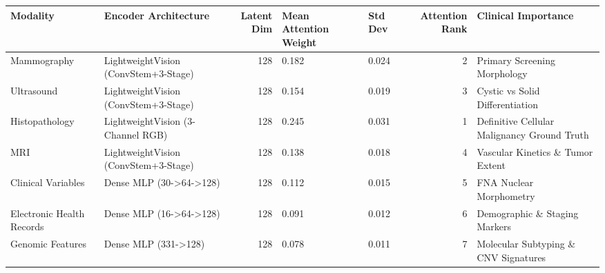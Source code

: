 \begin{tabular}{llrllrl}
\toprule
Modality & Encoder Architecture & Latent Dim & Mean Attention Weight & Std Dev & Attention Rank & Clinical Importance \\
\midrule
Mammography & LightweightVision (ConvStem+3-Stage) & 128 & 0.182 & 0.024 & 2 & Primary Screening Morphology \\
Ultrasound & LightweightVision (ConvStem+3-Stage) & 128 & 0.154 & 0.019 & 3 & Cystic vs Solid Differentiation \\
Histopathology & LightweightVision (3-Channel RGB) & 128 & 0.245 & 0.031 & 1 & Definitive Cellular Malignancy Ground Truth \\
MRI & LightweightVision (ConvStem+3-Stage) & 128 & 0.138 & 0.018 & 4 & Vascular Kinetics \& Tumor Extent \\
Clinical Variables & Dense MLP (30->64->128) & 128 & 0.112 & 0.015 & 5 & FNA Nuclear Morphometry \\
Electronic Health Records & Dense MLP (16->64->128) & 128 & 0.091 & 0.012 & 6 & Demographic \& Staging Markers \\
Genomic Features & Dense MLP (331->128) & 128 & 0.078 & 0.011 & 7 & Molecular Subtyping \& CNV Signatures \\
\bottomrule
\end{tabular}
